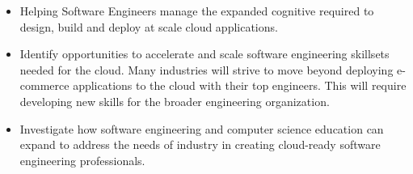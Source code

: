 \documentclass[conference]{IEEEconf}
\begin{document}
\begin{itemize}
	\item Helping Software Engineers manage the expanded cognitive required to design, build and deploy at scale cloud applications.
	\item Identify opportunities to accelerate and scale software engineering skillsets needed for the cloud. Many industries will strive to move beyond deploying e-commerce applications to the cloud with their top engineers. This will require developing new skills for the broader engineering organization.
	\item Investigate how software engineering and computer science education can expand to address the needs of industry in creating cloud-ready software engineering professionals. 
\end{itemize}




\end{document}
